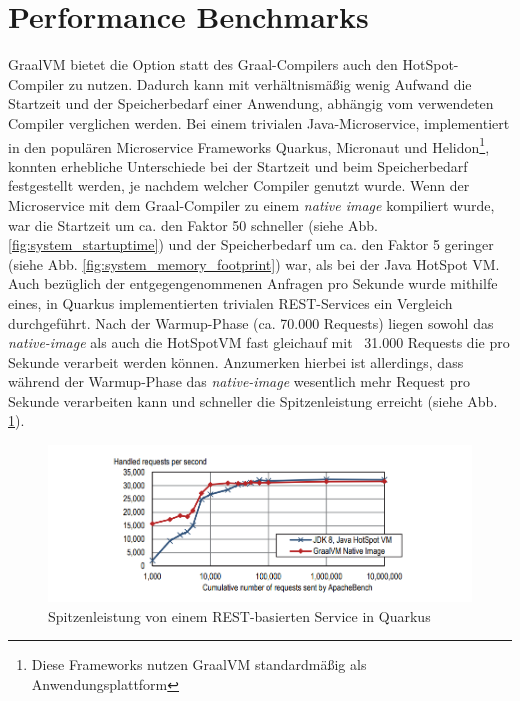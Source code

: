 \section{Performance Benchmarks}
\label{sec:performanceBenchmarks}

GraalVM bietet die Option statt des Graal-Compilers auch den HotSpot-Compiler zu nutzen. Dadurch kann mit verhältnismäßig wenig Aufwand
die Startzeit und der Speicherbedarf einer Anwendung, abhängig vom verwendeten Compiler verglichen werden. Bei einem trivialen Java-Microservice, implementiert in den populären
Microservice Frameworks Quarkus, Micronaut und Helidon\footnote{Diese Frameworks nutzen GraalVM standardmäßig als Anwendungsplattform}, konnten erhebliche Unterschiede bei der Startzeit und 
beim Speicherbedarf festgestellt werden, je nachdem welcher Compiler genutzt wurde. Wenn der Microservice mit dem Graal-Compiler zu einem \textit{native image} kompiliert wurde, war die Startzeit um
ca. den Faktor 50 schneller (siehe Abb. \ref{fig:system_startuptime}) und der Speicherbedarf um ca. den Faktor 5 geringer (siehe Abb. \ref{fig:system_memory_footprint}) war,
 als bei der Java HotSpot VM. Auch bezüglich der entgegengenommenen Anfragen pro Sekunde wurde mithilfe eines, in Quarkus implementierten
 trivialen REST-Services ein Vergleich durchgeführt. Nach der Warmup-Phase (ca. 70.000 Requests) liegen sowohl das \textit{native-image} als auch die HotSpotVM fast gleichauf mit ~31.000 Requests die pro
 Sekunde verarbeit werden können. Anzumerken hierbei ist allerdings, dass während der Warmup-Phase das \textit{native-image} wesentlich mehr Request pro Sekunde verarbeiten kann und schneller die
 Spitzenleistung erreicht (siehe Abb. \ref{fig:system_request}).
\begin{figure}[h]
	\centering
	\includegraphics[width=.9\textwidth]{resources/requests_vergleich.png}
	\caption{Spitzenleistung von einem REST-basierten Service in Quarkus \parencite[Fig.12]{Wimmer2019}}
	\label{fig:system_request}
\end{figure} 
\newpage
